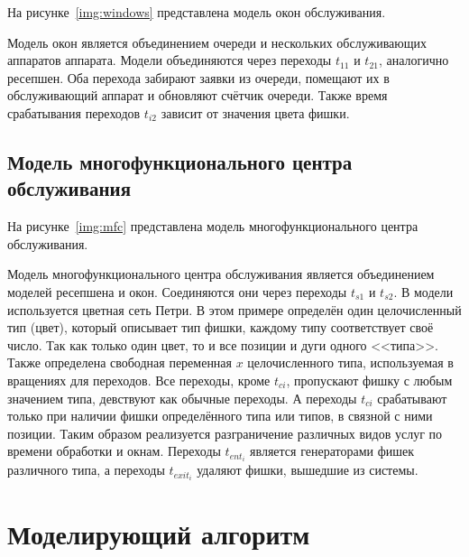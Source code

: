 На рисунке~\ref{img:windows} представлена модель окон обслуживания.

\FloatBarrier

Модель окон является объединением очереди и нескольких обслуживающих аппаратов аппарата. Модели объединяются через переходы $t_{11}$ и $t_{21}$, аналогично ресепшен. Оба перехода забирают заявки из очереди, помещают их в обслуживающий аппарат и обновляют счётчик очереди. Также время срабатывания переходов $t_{i2}$ зависит от значения цвета фишки.

\subsection{Модель многофункционального центра обслуживания}

На рисунке~\ref{img:mfc} представлена модель многофункционального центра обслуживания.

\FloatBarrier

Модель многофункционального центра обслуживания является объединением моделей ресепшена и окон. Соединяются они через переходы $t_{s1}$ и $t_{s2}$. В модели используется цветная сеть Петри. В этом примере определён один целочисленный тип (цвет), который описывает тип фишки, каждому типу соответствует своё число. Так как только один цвет, то и все позиции и дуги одного <<типа>>. Также определена свободная переменная $x$ целочисленного типа, используемая в вращениях для переходов. Все переходы, кроме $t_{ci}$, пропускают фишку с любым значением типа, девствуют как обычные переходы. А переходы $t_{ci}$ срабатывают только при наличии фишки определённого типа или типов, в связной с ними позиции. Таким образом реализуется разграничение различных видов услуг по времени обработки и окнам. Переходы $t_{ent_i}$ является генераторами фишек различного типа, а переходы $t_{exit_i}$ удаляют фишки, вышедшие из системы. 

\section{Моделирующий алгоритм}

